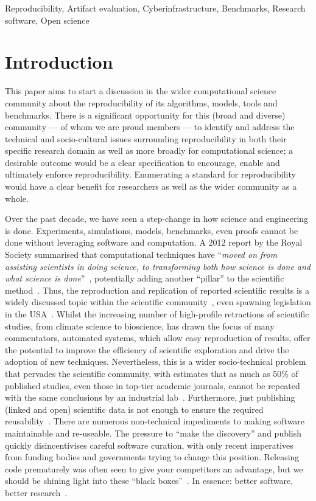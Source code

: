 \documentclass[conference]{IEEEtran}
\begin{document}
\begin{IEEEkeywords}
Reproducibility, Artifact evaluation, Cyberinfrastructure, Benchmarks, Research software, Open science
\end{IEEEkeywords}


\section{Introduction}

This paper aims to start a discussion in the wider computational
science community about the reproducibility of its algorithms, models,
tools and benchmarks. There is a significant opportunity for this
(broad and diverse) community --- of whom we are proud members --- to
identify and address the technical and socio-cultural issues
surrounding reproducibility in both their specific research domain as
well as more broadly for computational science; a desirable outcome
would be a clear specification to encourage, enable and ultimately
enforce reproducibility. Enumerating a standard for reproducibility
would have a clear benefit for researchers as well as the wider
community as a whole.

Over the past decade, we have seen a step-change in how science and
engineering is done. Experiments, simulations, models, benchmarks,
even proofs cannot be done without leveraging software and
computation. A 2012 report by the Royal Society summarised that
computational techniques have ``{\emph{moved on from assisting
scientists in doing science, to transforming both how science is done
and what science is done}}''~\cite{rssaaoe:2012}, potentially adding
another ``pillar'' to the scientific
method~\cite{hey:2009,vardi-cacm-2010}. Thus, the reproduction and
replication of reported scientific results is a widely discussed topic
within the scientific
community~\cite{schwab-et-al:2000,barnes:2010,mesirov:2010,morin-et-al:2012,joppa-et-al:2013},
even spawning legislation in the USA~\cite{hr4012:2014}.  Whilst the
increasing number of high-profile retractions of scientific studies,
from climate science to bioscience, has drawn the focus of many
commentators, automated systems, which allow easy reproduction of
results, offer the potential to improve the efficiency of scientific
exploration and drive the adoption of new techniques. Nevertheless,
this is a wider socio-technical problem that pervades the scientific
community, with estimates that as much as 50\% of published studies,
even those in top-tier academic journals, cannot be repeated with the
same conclusions by an industrial
lab~\cite{osherovich:2011}. Furthermore, just publishing (linked and
open) scientific data is not enough to ensure the required
reusability~\cite{bechhofer-et-al:2013}. There are numerous
non-technical impediments to making software maintainable and
re-useable. The pressure to ``make the discovery'' and publish quickly
disincentivises careful software curation, with only recent
imperatives from funding bodies and governments trying to change this
position. Releasing code prematurely was often seen to give your
competitors an advantage, but we should be shining light into these
``black boxes''~\cite{morin-et-al:2012}. In essence: better software,
better research~\cite{goble:2014}.
\end{document}
